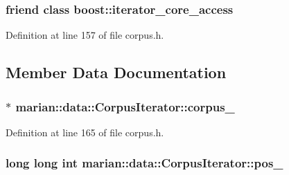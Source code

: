 \subsubsection[{\texorpdfstring{boost\+::iterator\+\_\+core\+\_\+access}{boost::iterator_core_access}}]{\setlength{\rightskip}{0pt plus 5cm}friend class boost\+::iterator\+\_\+core\+\_\+access\hspace{0.3cm}{\ttfamily [friend]}}\hypertarget{classmarian_1_1data_1_1CorpusIterator_ac09f73e325921cc50ebcd96bed0f8096}{}\label{classmarian_1_1data_1_1CorpusIterator_ac09f73e325921cc50ebcd96bed0f8096}


Definition at line 157 of file corpus.\+h.



\subsection{Member Data Documentation}
\subsubsection[{\texorpdfstring{corpus\+\_\+}{corpus_}}]{$\ast$ marian\+::data\+::\+Corpus\+Iterator\+::corpus\+\_\+\hspace{0.3cm}{\ttfamily [private]}}\hypertarget{classmarian_1_1data_1_1CorpusIterator_a654288ed5f1fb4064c17237508a7437e}{}\label{classmarian_1_1data_1_1CorpusIterator_a654288ed5f1fb4064c17237508a7437e}


Definition at line 165 of file corpus.\+h.

\subsubsection[{\texorpdfstring{pos\+\_\+}{pos_}}]{\setlength{\rightskip}{0pt plus 5cm}long long int marian\+::data\+::\+Corpus\+Iterator\+::pos\+\_\+\hspace{0.3cm}{\ttfamily [private]}}\hypertarget{classmarian_1_1data_1_1CorpusIterator_a88c3108e7338412a02908b676ff5f637}{}\label{classmarian_1_1data_1_1CorpusIterator_a88c3108e7338412a02908b676ff5f637}


